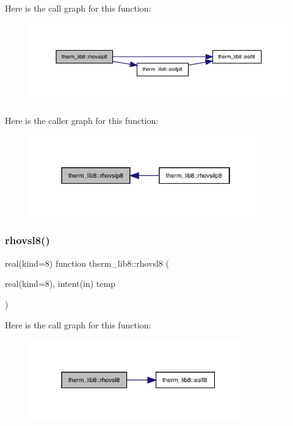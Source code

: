 Here is the call graph for this function\+:
\nopagebreak
\begin{figure}[H]
\begin{center}
\leavevmode
\includegraphics[width=350pt]{namespacetherm__lib8_a9ad0dba1a5ff870a6a36cd06835e8e15_cgraph}
\end{center}
\end{figure}
Here is the caller graph for this function\+:
\nopagebreak
\begin{figure}[H]
\begin{center}
\leavevmode
\includegraphics[width=286pt]{namespacetherm__lib8_a9ad0dba1a5ff870a6a36cd06835e8e15_icgraph}
\end{center}
\end{figure}
\mbox{\label{namespacetherm__lib8_a7637ae750048c15021f04db2db524ed9}} 
\subsubsection{\texorpdfstring{rhovsl8()}{rhovsl8()}}
{\footnotesize\ttfamily real(kind=8) function therm\+\_\+lib8\+::rhovsl8 (\begin{DoxyParamCaption}\item[{real(kind=8), intent(in)}]{temp }\end{DoxyParamCaption})}

Here is the call graph for this function\+:
\nopagebreak
\begin{figure}[H]
\begin{center}
\leavevmode
\includegraphics[width=268pt]{namespacetherm__lib8_a7637ae750048c15021f04db2db524ed9_cgraph}
\end{center}
\end{figure}
\mbox{\label{namespacetherm__lib8_a8f1e9b7f94a457d1972dc10825caefe3}} 
